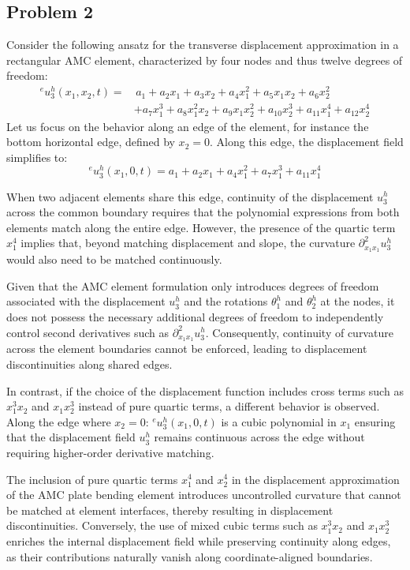 \documentclass[12pt]{article}
\begin{document}
\subsection*{Problem 2}
Consider the following ansatz for the transverse displacement approximation in a rectangular AMC element, characterized by four nodes and thus twelve degrees of freedom:
\begin{align*}
    {}^e u_3^h(x_1,x_2,t) = & \, a_1 + a_2 x_1 + a_3 x_2 + a_4 x_1^2 + a_5 x_1 x_2 + a_6 x_2^2                         \\
                            & + a_7 x_1^3 + a_8 x_1^2 x_2 + a_9 x_1 x_2^2 + a_{10} x_2^3 + a_{11} x_1^4 + a_{12} x_2^4
\end{align*}
Let us focus on the behavior along an edge of the element, for instance the bottom horizontal edge, defined by \( x_2 = 0 \). Along this edge, the displacement field simplifies to:
\[
    {}^e u_3^h(x_1,0,t) = a_1 + a_2 x_1 + a_4 x_1^2 + a_7 x_1^3 + a_{11} x_1^4
\]

When two adjacent elements share this edge, continuity of the displacement \( u_3^h \) across the common boundary requires that the polynomial expressions from both elements match along the entire edge. However, the presence of the quartic term \( x_1^4 \) implies that, beyond matching displacement and slope, the curvature \( \partial^2_{x_1 x_1} u_3^h \) would also need to be matched continuously.

Given that the AMC element formulation only introduces degrees of freedom associated with the displacement \( u_3^h \) and the rotations \( \theta_1^h \) and \( \theta_2^h \) at the nodes, it does not possess the necessary additional degrees of freedom to independently control second derivatives such as \( \partial^2_{x_1 x_1} u_3^h \). Consequently, continuity of curvature across the element boundaries cannot be enforced, leading to displacement discontinuities along shared edges.

In contrast, if the choice of the displacement function includes cross terms such as \( x_1^3 x_2 \) and \( x_1 x_2^3 \) instead of pure quartic terms, a different behavior is observed. Along the edge where \( x_2 = 0 \):  ${}^e u_3^h(x_1,0,t)$ is a cubic polynomial in $x_1$ ensuring that the displacement field \( u_3^h \) remains continuous across the edge without requiring higher-order derivative matching.

The inclusion of pure quartic terms \( x_1^4 \) and \( x_2^4 \) in the displacement approximation of the AMC plate bending element introduces uncontrolled curvature that cannot be matched at element interfaces, thereby resulting in displacement discontinuities. Conversely, the use of mixed cubic terms such as \( x_1^3 x_2 \) and \( x_1 x_2^3 \) enriches the internal displacement field while preserving continuity along edges, as their contributions naturally vanish along coordinate-aligned boundaries.
\end{document}
